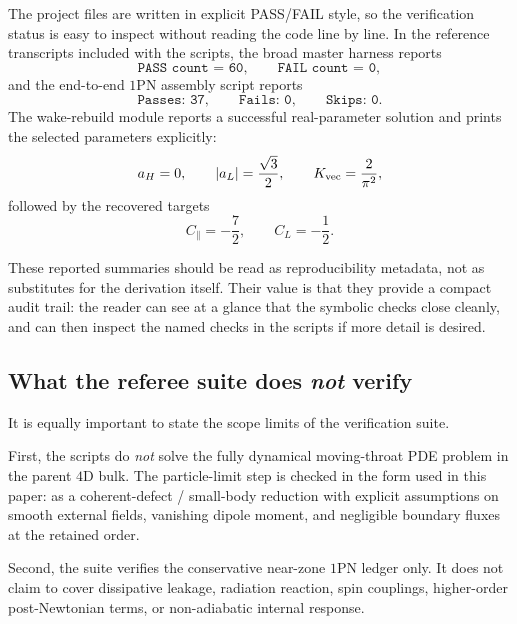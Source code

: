 \documentclass[11pt]{article}
\begin{document}
The project files are written in explicit PASS/FAIL style, so the verification status is
easy to inspect without reading the code line by line. In the reference transcripts
included with the scripts, the broad master harness reports
\begin{equation}
\texttt{PASS count = 60},
\qquad
\texttt{FAIL count = 0},
\label{eq:verification-master-count}
\end{equation}
and the end-to-end \(1\)PN assembly script reports
\begin{equation}
\texttt{Passes: 37},
\qquad
\texttt{Fails: 0},
\qquad
\texttt{Skips: 0}.
\label{eq:verification-assembly-count}
\end{equation}
The wake-rebuild module reports a successful real-parameter solution and prints the selected
parameters explicitly:
\begin{equation}
a_H=0,
\qquad
|a_L|=\frac{\sqrt3}{2},
\qquad
K_{\rm vec}=\frac{2}{\pi^2},
\label{eq:verification-wake-output}
\end{equation}
followed by the recovered targets
\begin{equation}
C_\parallel=-\frac72,
\qquad
C_L=-\frac12.
\label{eq:verification-wake-targets}
\end{equation}

These reported summaries should be read as reproducibility metadata, not as substitutes for
the derivation itself. Their value is that they provide a compact audit trail: the reader
can see at a glance that the symbolic checks close cleanly, and can then inspect the named
checks in the scripts if more detail is desired.

\subsection{What the referee suite does \emph{not} verify}
\label{sec:verification-scope}

It is equally important to state the scope limits of the verification suite.

First, the scripts do \emph{not} solve the fully dynamical moving-throat PDE problem in the
parent \(4\)D bulk. The particle-limit step is checked in the form used in this paper:
as a coherent-defect / small-body reduction with explicit assumptions on smooth external
fields, vanishing dipole moment, and negligible boundary fluxes at the retained order.

Second, the suite verifies the conservative near-zone \(1\)PN ledger only. It does not
claim to cover dissipative leakage, radiation reaction, spin couplings, higher-order
post-Newtonian terms, or non-adiabatic internal response.
\end{document}
